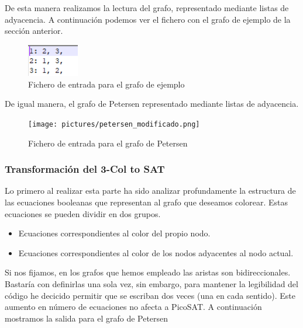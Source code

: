 \documentclass{article}
\begin{document}
        De esta manera realizamos la lectura del grafo, representado mediante listas de adyacencia.
        A continuación podemos ver el fichero con el grafo de ejemplo de la sección anterior.
        \begin{figure}[H]
            \centering
            \includegraphics[width=0.2\textwidth]{pictures/entrada_ejemplo.png}
            \caption{Fichero de entrada para el grafo de ejemplo}
        \end{figure}

        De igual manera, el grafo de Petersen representado mediante listas de adyacencia. 
        \begin{figure}[H]
            \centering
            \texttt{[image: pictures/petersen\_modificado.png]}
            \caption{Fichero de entrada para el grafo de Petersen}
        \end{figure}
    
    \subsubsection{Transformación del 3-Col to SAT}
        Lo primero al realizar esta parte ha sido analizar profundamente la estructura de las ecuaciones booleanas que 
        representan al grafo que deseamos colorear.
        Estas ecuaciones se pueden dividir en dos grupos.
        \begin{itemize}
            \item Ecuaciones correspondientes al color del propio nodo.
            \item Ecuaciones correspondientes al color de los nodos adyacentes al nodo actual.
        \end{itemize}
        Si nos fijamos, en los grafos que hemos empleado las aristas son bidireccionales. Bastaría con definirlas una sola vez, 
        sin embargo, para mantener la legibilidad del código he decicido permitir que se escriban dos veces (una en cada sentido).
        Este aumento en número de ecuaciones no afecta a PicoSAT. A continuación mostramos la salida para el grafo de Petersen 
    
\end{document}

